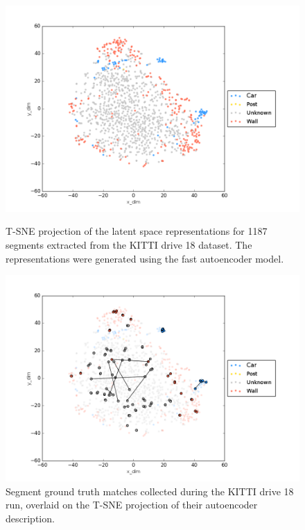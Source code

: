 \begin{figure}[p]
  \centering
  \includegraphics[width=5.2in]{images/t-sne.png}
  \caption{T-SNE projection of the latent space representations for 1187 segments extracted from the KITTI drive 18 dataset. The representations were generated using the fast autoencoder model.}
  \label{fig:tsne}
  \hfill
  \includegraphics[width=5.2in]{images/t-sne_matches.png}
  \caption{Segment ground truth matches collected during the KITTI drive 18 run, overlaid on the T-SNE projection of their autoencoder description.}
  \label{fig:tsne_matches}
\end{figure}

